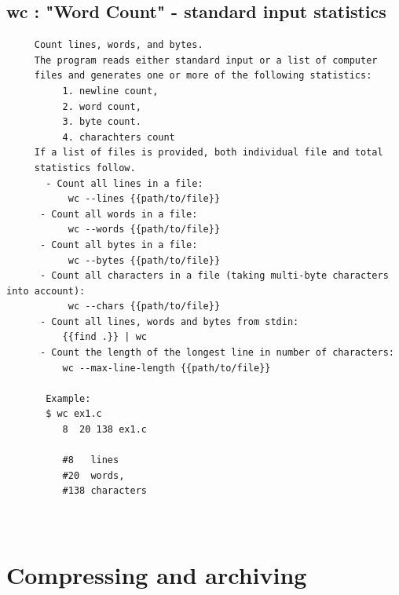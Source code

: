 \documentclass[a4paper,12pt]{article}
\begin{document}
\subsection{wc     : "Word Count" - standard input statistics}
\begin{verbatim}
     Count lines, words, and bytes.     
     The program reads either standard input or a list of computer
     files and generates one or more of the following statistics: 
          1. newline count,
          2. word count,
          3. byte count. 
          4. charachters count
     If a list of files is provided, both individual file and total
     statistics follow.
       - Count all lines in a file: 
           wc --lines {{path/to/file}}
      - Count all words in a file:
           wc --words {{path/to/file}}
      - Count all bytes in a file:
           wc --bytes {{path/to/file}}
      - Count all characters in a file (taking multi-byte characters into account):
           wc --chars {{path/to/file}}
      - Count all lines, words and bytes from stdin: 
          {{find .}} | wc
      - Count the length of the longest line in number of characters:
          wc --max-line-length {{path/to/file}}
          
       Example: 
       $ wc ex1.c
          8  20 138 ex1.c

          #8   lines
          #20  words,
          #138 characters   
          
          
\end{verbatim}


\section{Compressing and archiving}
\end{document}
